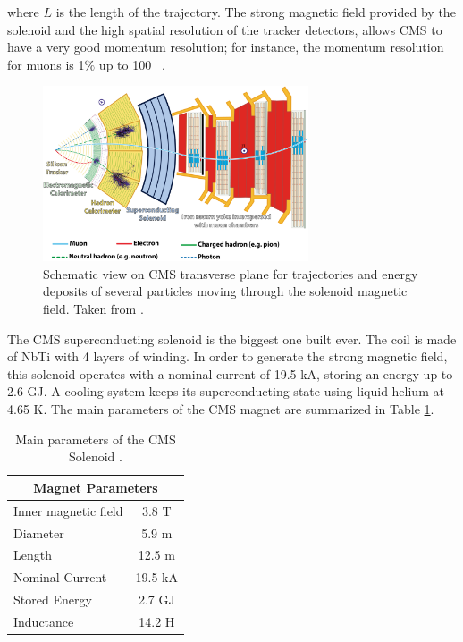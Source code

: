 \noindent where $L$ is the length of the trajectory. The strong magnetic field provided by the solenoid 
and the high spatial resolution of the tracker detectors, allows CMS to have 
a very good momentum resolution; for instance, the momentum resolution for muons 
is 1$\%$ up to 100 \GeV~\cite{chp2:CMSTDR2}.\\


\begin{figure}[ht]
    \begin{center}
      \includegraphics[width=0.7\textwidth]{figuras/Chapter2/CMStrajectories.png}
      \caption{Schematic view on CMS transverse plane for trajectories and energy deposits of several 
      particles moving through the solenoid magnetic field. Taken from \cite{Barney:2120661}.
      } \label{figchp2:CMStrajectories}
    \end{center}
 \end{figure}

\noindent The CMS superconducting solenoid is the biggest one built ever. The coil is made of NbTi with 4 layers of winding. In order to 
generate the strong magnetic field, this solenoid operates
with a nominal current of 19.5 kA, storing an energy up to 2.6 GJ. A cooling system
keeps its superconducting state using liquid helium at 4.65 K. The 
main parameters of the CMS magnet are summarized in Table \ref{tablechp2:Solenoid}.

\begin{table}[h]
\centering
\begin{tabular}{|l|c|}\hline \hline
\multicolumn{2}{|c|}{Magnet Parameters}  \\ \hline \hline
Inner magnetic field   &  3.8 T  \\ \hline
Diameter               &  5.9 m  \\ \hline
Length                 &  12.5 m  \\ \hline
Nominal Current        &  19.5 kA \\ \hline
Stored Energy          &  2.7 GJ  \\ \hline
Inductance             &  14.2 H  \\ \hline \hline
\end{tabular}
\caption{Main parameters of the CMS Solenoid \cite{chp2:CMSTDR}.} \label{tablechp2:Solenoid}
\end{table}




